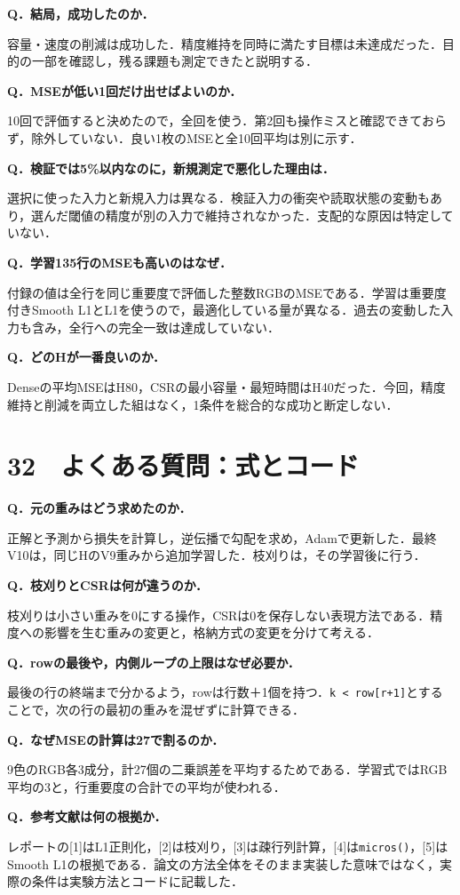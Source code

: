 \documentclass[
  14pt,
  a5paper,
]{extarticle}
\begin{document}
\textbf{Q．結局，成功したのか．}

容量・速度の削減は成功した．精度維持を同時に満たす目標は未達成だった．目的の一部を確認し，残る課題も測定できたと説明する．

\textbf{Q．MSEが低い1回だけ出せばよいのか．}

10回で評価すると決めたので，全回を使う．第2回も操作ミスと確認できておらず，除外していない．良い1枚のMSEと全10回平均は別に示す．

\textbf{Q．検証では5\%以内なのに，新規測定で悪化した理由は．}

選択に使った入力と新規入力は異なる．検証入力の衝突や読取状態の変動もあり，選んだ閾値の精度が別の入力で維持されなかった．支配的な原因は特定していない．

\textbf{Q．学習135行のMSEも高いのはなぜ．}

付録の値は全行を同じ重要度で評価した整数RGBのMSEである．学習は重要度付きSmooth
L1とL1を使うので，最適化している量が異なる．過去の変動した入力も含み，全行への完全一致は達成していない．

\textbf{Q．どのHが一番良いのか．}

Denseの平均MSEはH80，CSRの最小容量・最短時間はH40だった．今回，精度維持と削減を両立した組はなく，1条件を総合的な成功と断定しない．

\newpage

\section{32　よくある質問：式とコード}\label{ux3088ux304fux3042ux308bux8ceaux554fux5f0fux3068ux30b3ux30fcux30c9}

\textbf{Q．元の重みはどう求めたのか．}

正解と予測から損失を計算し，逆伝播で勾配を求め，Adamで更新した．最終V10は，同じHのV9重みから追加学習した．枝刈りは，その学習後に行う．

\textbf{Q．枝刈りとCSRは何が違うのか．}

枝刈りは小さい重みを0にする操作，CSRは0を保存しない表現方法である．精度への影響を生む重みの変更と，格納方式の変更を分けて考える．

\textbf{Q．rowの最後や，内側ループの上限はなぜ必要か．}

最後の行の終端まで分かるよう，rowは行数＋1個を持つ．\texttt{k\ \textless{}\ row{[}r+1{]}}とすることで，次の行の最初の重みを混ぜずに計算できる．

\textbf{Q．なぜMSEの計算は27で割るのか．}

9色のRGB各3成分，計27個の二乗誤差を平均するためである．学習式ではRGB平均の3と，行重要度の合計での平均が使われる．

\textbf{Q．参考文献は何の根拠か．}

レポートの{[}1{]}はL1正則化，{[}2{]}は枝刈り，{[}3{]}は疎行列計算，{[}4{]}は\texttt{micros()}，{[}5{]}はSmooth
L1の根拠である．論文の方法全体をそのまま実装した意味ではなく，実際の条件は実験方法とコードに記載した．
\end{document}
